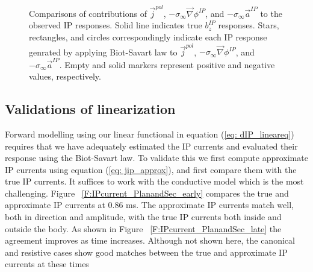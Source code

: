\documentclass[extra,mreferee]{gji}
\newcommand{\grad}{\vec \nabla}
\newcommand{\siginf}{\sigma_\infty}
\renewcommand {\j}  { {\vec j} }
\begin{document}
\begin{figure}
  \caption{Comparisons of contributions of $\j^{pol}$, $-\siginf\grad \phi^{IP}$, and $-\siginf\vec{a}^{IP}$ to the observed IP responses. Solid line indicates true $b_z^{IP}$ responses. Stars, rectangles, and circles correspondingly indicate each IP response genrated by applying Biot-Savart law to $\j^{pol}$, $-\siginf\grad \phi^{IP}$, and $-\siginf\vec{a}^{IP}$. Empty and solid markers represent positive and negative values, respectively. }
  \label{F:DecompjIPcond}
\end{figure}
\clearpage

\subsection{Validations of linearization}
Forward modelling using our linear functional in equation (\ref{eq: dIP_lineareq}) requires that we have adequately estimated the IP currents and evaluated their response using the Biot-Savart law. To validate this we first compute approximate IP currents using equation (\ref{eq: jip_approx}), and first compare them with the true IP currents. It suffices to work with the conductive model which is the most challenging. Figure ~\ref{F:IPcurrent_PlanandSec_early} compares the true and approximate IP currents at 0.86 ms. The approximate IP currents match well, both in direction and amplitude, with the true IP currents both inside and outside the body. As shown in Figure ~\ref{F:IPcurrent_PlanandSec_late} the agreement improves as time increases. Although not shown here, the canonical and resistive cases show good matches between the true and approximate IP currents at these times
\end{document}
